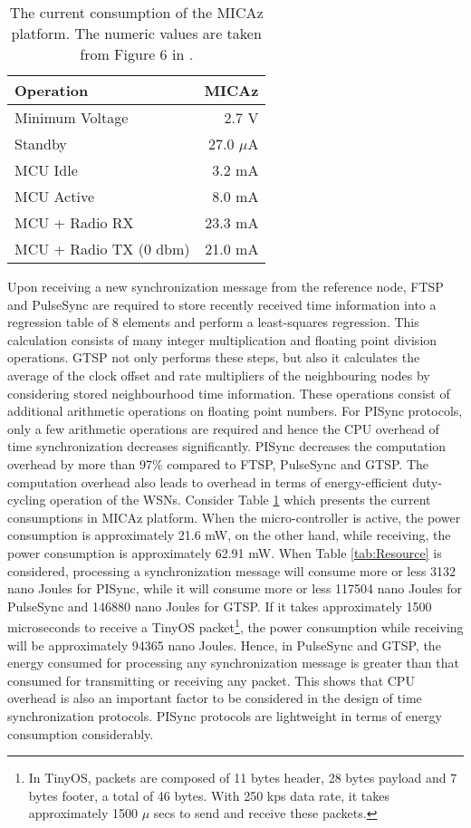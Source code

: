 \documentclass[english,a4paper,10pt,final]{article}
\numberwithin{equation}{section}
\numberwithin{figure}{section}
\begin{document}
\begin{table}
\center

\caption{The current consumption of the MICAz platform. The numeric values are taken from Figure 6 in
\cite{Telos:2005}. \label{tab:The-current-consumptions}}

{
\begin{tabular}{|l|r|}
\hline 
\textbf{Operation} & \textbf{MICAz}\\
\hline 
Minimum Voltage  & 2.7 V\\
\hline 
Standby & 27.0 $\mu$A\\
MCU Idle & 3.2 mA\\
MCU Active & 8.0 mA\\
MCU + Radio RX  & 23.3 mA\\
MCU + Radio TX (0 dbm) & 21.0 mA\\
\hline
\end{tabular}
}
\end{table}

Upon receiving a new synchronization message from the reference node, FTSP and PulseSync are required to store recently received time information into a regression table of 8 elements and perform a least-squares regression. This calculation consists of many integer multiplication and floating point division operations. GTSP not only performs these steps, but also it calculates the average of the clock offset and rate multipliers of the neighbouring nodes by considering stored neighbourhood time information. These operations consist of additional arithmetic operations on floating point numbers. For PISync protocols, only a few arithmetic operations are required and hence the CPU overhead of time synchronization decreases significantly. PISync decreases the computation overhead by more than 97\% compared to FTSP, PulseSync and  GTSP. The computation overhead also leads to overhead in terms of energy-efficient duty-cycling operation of the WSNs. Consider Table \ref{tab:The-current-consumptions} which presents the current consumptions in MICAz platform. When the micro-controller is active, the power consumption is approximately 21.6 mW, on the other hand, while receiving, the power consumption is approximately 62.91 mW. When Table \ref{tab:Resource} is considered,  processing a synchronization message will consume more or less 3132 nano Joules for PISync, while it will consume more or less 117504 nano Joules for PulseSync and 146880 nano Joules for GTSP. If it takes approximately 1500 microseconds to receive a TinyOS packet\footnote{In TinyOS, packets are composed of 11 bytes header, 28 bytes payload and 7 bytes footer, a total of 46 bytes. With 250 kps data rate, it takes approximately 1500 $\mu$ secs to send and receive these packets.}, the power consumption while receiving will be approximately 94365 nano Joules. Hence, in PulseSync and GTSP, the energy consumed for processing any synchronization message is greater than that consumed for transmitting or receiving any packet. This shows that CPU overhead is also an important factor to be considered in the design of time synchronization protocols. PISync protocols are lightweight in terms of energy consumption considerably.
\end{document}
